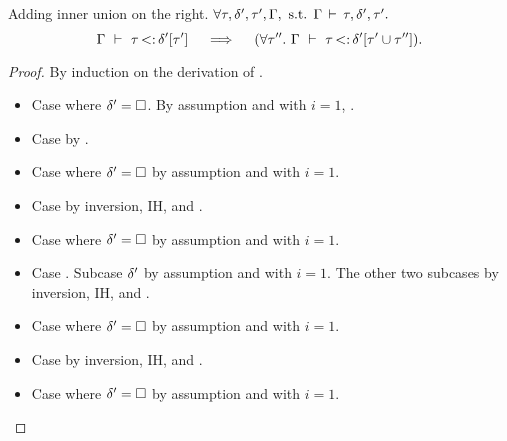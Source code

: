 \begin{lemma}{Adding inner union on the right.}%
\label{lem:add-inner-union-right}
    $\forall \tau, \delta', \tau', \Gamma, \text{ s.t. }
    \Gamma\,\vdash\,\tau, \delta', \tau'.$
    \[
        \subtydflt{\ty}{\plug{\dctx'}{\ty'}}
        \quad\implies\quad
        (\forall \ty''.\ \subtydflt{\ty}{\plug{\dctx'}{\tyunion{\ty'}{\ty''}}}).
    \]
\end{lemma}
\begin{proof}
    By induction on the derivation of
    .
    \begin{itemize}
        \item Case  where $\delta'=\square$. By assumption
            \subtydflt{\ty}{\tyany} and  with $i=1$,
            .
        \item Case  by .
        \item Case  where $\delta'=\square$
            by assumption and  with $i=1$.
        \item Case  by inversion, IH, and .
        \item Case  where $\delta'=\square$
            by assumption and  with $i=1$.
        \item Case . 
            Subcase $\delta'$ by assumption and  with $i=1$.
            The other two subcases by inversion, IH, and .
        \item Case  where $\delta'=\square$
            by assumption and  with $i=1$.
        \item Case  by inversion, IH, and .
        \item Case  where $\delta'=\square$
            by assumption and  with $i=1$.
    \end{itemize}
\end{proof}

